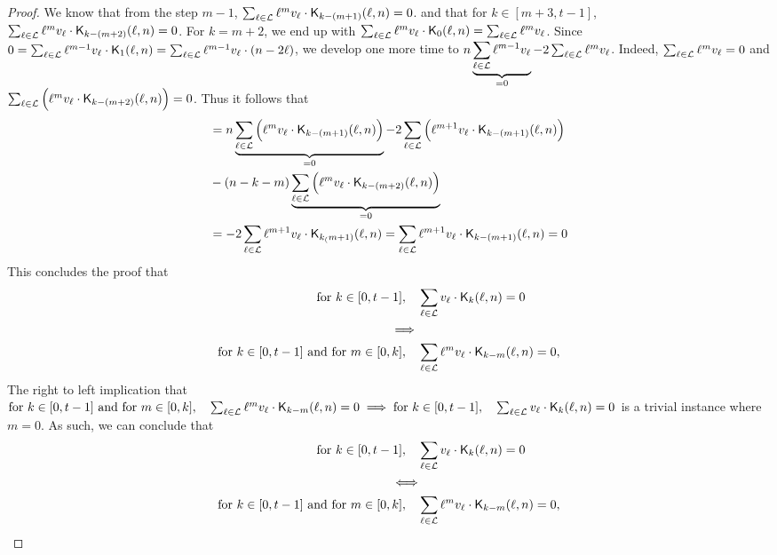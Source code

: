 \begin{proof}
    We know that from the step $m-1$, $\sum_{\ell \in \mathcal{L}} \ell^mv_\ell \cdot \mathsf{K}_{k-(m+1)}(\ell,n) = 0$.
    and that for $k \in [m+3, t-1]$, $\sum_{\ell \in \mathcal{L}} \ell^mv_\ell \cdot \mathsf{K}_{k-(m+2)}(\ell,n) = 0$.
    For $k = m + 2$, we end up with $\sum_{\ell \in \mathcal{L}} \ell^mv_\ell \cdot \mathsf{K}_{0}(\ell,n) = \sum_{\ell \in \mathcal{L}} \ell^mv_\ell$. Since $0 = \sum_{\ell \in \mathcal{L}} \ell^{m-1}v_\ell \cdot \mathsf{K}_{1}(\ell,n) = \sum_{\ell \in \mathcal{L}} \ell^{m-1}v_\ell \cdot (n - 2\ell)$,
    we develop one more time to $n\underbrace{\sum_{\ell \in \mathcal{L}} \ell^{m-1}v_\ell}_{=0} - 2\sum_{\ell \in \mathcal{L}} \ell^mv_\ell$.
    Indeed, $\sum_{\ell \in \mathcal{L}} \ell^mv_\ell = 0$ and $\sum_{\ell \in \mathcal{L}} \Big( \ell^mv_\ell \cdot \mathsf{K}_{k-(m+2)}(\ell,n) \Big) = 0$.
    Thus it follows that
    \begin{equation*}
    \begin{split}
        & = n \underbrace{\sum_{\ell \in \mathcal{L}} \Big( \ell^mv_\ell \cdot \mathsf{K}_{k-(m+1)}(\ell,n) \Big)}_{=0} - 2\sum_{\ell \in \mathcal{L}} \Big( \ell^{m+1}v_\ell \cdot \mathsf{K}_{k-(m+1)}(\ell,n) \Big)\\& - (n - k - m)\underbrace{\sum_{\ell \in \mathcal{L}} \Big( \ell^mv_\ell \cdot \mathsf{K}_{k-(m+2)}(\ell,n) \Big)}_{=0}\\
        &= -2\sum_{\ell \in \mathcal{L}} \ell^{m+1}v_\ell \cdot \mathsf{K}_{k_(m+1)}(\ell,n) = \sum_{\ell \in \mathcal{L}} \ell^{m+1}v_\ell \cdot \mathsf{K}_{k-(m+1)}(\ell,n) = 0
    \end{split}
    \end{equation*}
    This concludes the proof that
    \begin{equation*}
        \begin{split}
            \text{for } k \in [0, t-1], \quad &\sum_{\ell \in \mathcal{L}} v_\ell \cdot \mathsf{K}_{k}(\ell,n) = 0\\
            \implies\\
            \text{for } k \in [0, t-1] \text{ and for } m \in [0, k], \quad &\sum_{\ell \in \mathcal{L}} \ell^mv_\ell \cdot \mathsf{K}_{k-m}(\ell,n) = 0,
        \end{split}
    \end{equation*}
    The right to left implication that $\text{for } k \in [0, t-1] \text{ and for } m \in [0, k], \quad \sum_{\ell \in \mathcal{L}} \ell^mv_\ell \cdot \mathsf{K}_{k-m}(\ell,n) = 0 \implies \text{for } k \in [0, t-1], \quad \sum_{\ell \in \mathcal{L}} v_\ell \cdot \mathsf{K}_{k}(\ell,n) = 0$ is a trivial instance where $m = 0$.
    As such, we can conclude that
    \begin{equation*}
        \begin{split}
            \text{for } k \in [0, t-1], \quad &\sum_{\ell \in \mathcal{L}} v_\ell \cdot \mathsf{K}_{k}(\ell,n) = 0\\
            \Longleftrightarrow\\
            \text{for } k \in [0, t-1] \text{ and for } m \in [0, k], \quad &\sum_{\ell \in \mathcal{L}} \ell^mv_\ell \cdot \mathsf{K}_{k-m}(\ell,n) = 0,
        \end{split}
    \end{equation*}


\end{proof}

